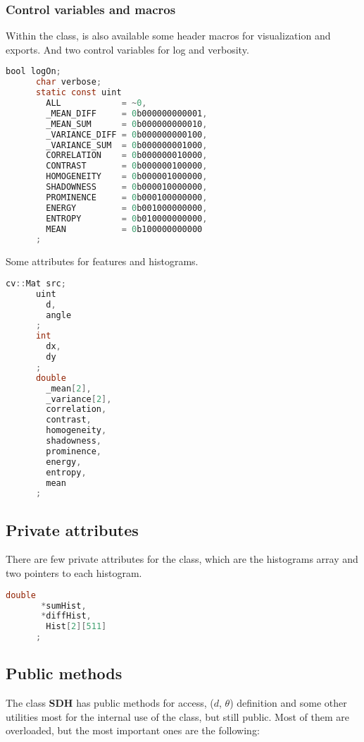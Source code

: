 \subsubsection{Control variables and macros} \label{control_variables}
Within the class, is also available some header macros for
visualization and exports. And two control variables for log and
verbosity.
\begin{file}
  \begin{lstlisting}[language=C]
      bool logOn;
      char verbose;
      static const uint
        ALL            = ~0,
        _MEAN_DIFF     = 0b000000000001,
        _MEAN_SUM      = 0b000000000010,
        _VARIANCE_DIFF = 0b000000000100,
        _VARIANCE_SUM  = 0b000000001000,
        CORRELATION    = 0b000000010000,
        CONTRAST       = 0b000000100000,
        HOMOGENEITY    = 0b000001000000,
        SHADOWNESS     = 0b000010000000,
        PROMINENCE     = 0b000100000000,
        ENERGY         = 0b001000000000,
        ENTROPY        = 0b010000000000,
        MEAN           = 0b100000000000
      ;
  \end{lstlisting}
\end{file}

Some attributes for features and histograms.
\begin{file}
  \begin{lstlisting}[language=C]
      cv::Mat src;
      uint
        d,
        angle
      ;
      int
        dx,
        dy
      ;
      double
        _mean[2],
        _variance[2],
        correlation,
        contrast,
        homogeneity,
        shadowness,
        prominence,
        energy,
        entropy,
        mean
      ;
  \end{lstlisting}
\end{file}
\subsection{Private attributes}
There are few private attributes for the class,
which are the histograms array and two pointers to each
histogram.
\begin{file}
  \begin{lstlisting}[language=C]
      double
       *sumHist,
       *diffHist,
        Hist[2][511]
      ;
  \end{lstlisting}
\end{file}


\subsection{Public methods}
The class \textbf{SDH} has public methods for access, ($d$, $\theta$) definition
and some other utilities most for the internal use of the class, but still public.
Most of them are overloaded, but the most important ones are the following:

